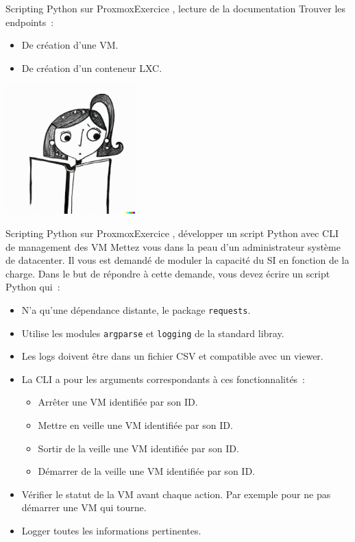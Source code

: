 \documentclass{beamer}
\begin{document}
    \begin{frame}{Scripting Python sur Proxmox}{Exercice \execcounterdispinc{}, lecture de la documentation}
        Trouver les endpoints~:
        \begin{itemize}
            \item De création d'une VM.
            \item De création d'un conteneur LXC.
        \end{itemize}
        \bigbreak
        \centering
        \includegraphics[width=5cm]{image/girl-rtfm.png}
    \end{frame}

    \begin{frame}{Scripting Python sur Proxmox}{Exercice \execcounterdispinc{}, développer un script Python avec CLI de management des VM}
        Mettez vous dans la peau d'un administrateur système de datacenter.
        Il vous est demandé de moduler la capacité du SI en fonction de la charge.
        Dans le but de répondre à cette demande, vous devez écrire un script Python qui~:
        \begin{itemize}
            \item N'a qu'une dépendance distante, le package \lstinline{requests}.
            \item Utilise les modules \lstinline{argparse} et \lstinline{logging} de la standard libray.
            \item Les logs doivent être dans un fichier CSV et compatible avec un viewer.
            \item La CLI a pour les arguments correspondants à ces fonctionnalités~:
            \begin{itemize}
                \item Arrêter une VM identifiée par son ID.
                \item Mettre en veille une VM identifiée par son ID.
                \item Sortir de la veille une VM identifiée par son ID.
                \item Démarrer de la veille une VM identifiée par son ID.
            \end{itemize}
            \item Vérifier le statut de la VM avant chaque action.
            Par exemple pour ne pas démarrer une VM qui tourne.
            \item Logger toutes les informations pertinentes.
        \end{itemize}
    \end{frame}
\end{document}
